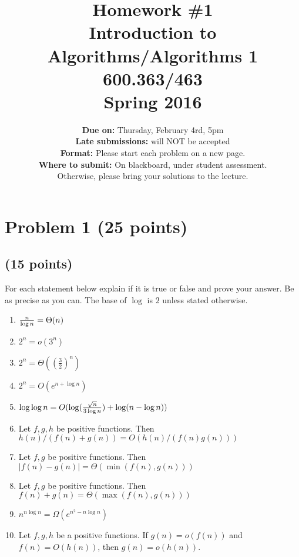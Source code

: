 \documentclass[letterpaper, 11pt]{article}
\begin{document}
\title{Homework \#1 \\ Introduction to Algorithms/Algorithms 1 \\ 600.363/463 \\ Spring 2016}
\author{\textbf{Due on:} Thursday, February 4rd, 5pm \\
\textbf{Late submissions:} will NOT be accepted\\
\textbf{Format:} Please start each problem on a new page.
\\\textbf{Where to submit:} On blackboard, under student assessment. \\
Otherwise, please bring your solutions to the lecture.
\\}
\maketitle

\section{Problem 1 (25 points)}

\subsection{(15 points)}
For each statement below explain if it is true or false and prove
your answer. Be as precise as you can. The base of $\log$ is $2$ unless stated otherwise.

\begin{enumerate}

\item  ${n\over \log n} = \Theta(n)$

\item $2^n = o(3^{n})$

\item $2^n = \Theta(\left(\frac{3}{2}\right)^{n})$

\item $2^n = O(e^{n+\log n})$

\item $\log \log n = O(\log({\sqrt{n}\over 3\log n})+\log(n-\log n))$

\item Let $f,g,h$ be positive functions. Then $h(n)/(f(n)+g(n)) = O(h(n)/(f(n)g(n)))$

\item Let $f,g$ be positive functions. Then $|f(n) - g(n)| = \Theta(\min(f(n),g(n)))$

\item Let $f,g$ be positive functions. Then $f(n) + g(n) = \Theta(\max(f(n),g(n)))$

\item $n^{n\log n} = \Omega(e^{n^2 - n\log n})$

\item Let $f, g, h$ be a positive functions. If $g(n) = o(f(n))$ and $f(n) = O(h(n))$, then $g(n) = o(h(n))$.


\end{enumerate}
\end{document}
